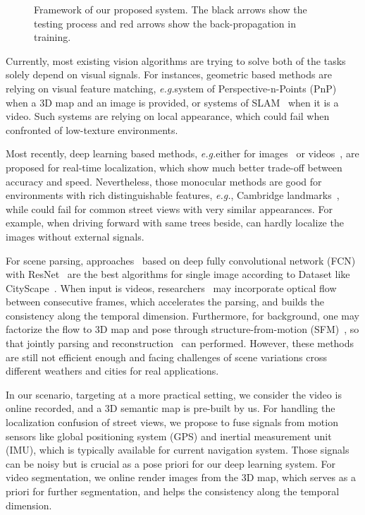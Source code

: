 \documentclass[10pt,twocolumn,letterpaper]{article}
\def\eg{\emph{e.g.}}
\begin{document}
\begin{figure*}[t]
\fbox{\rule{0pt}{2in} \rule{.9\linewidth}{0pt}}
   \caption{Framework of our proposed system. The black arrows show the testing process and red arrows show the back-propagation in training.}
\label{fig:framework}
\end{figure*}

Currently, most existing vision algorithms are trying to solve both of the tasks solely depend on visual signals. 
For instances, geometric based methods are relying on visual feature matching, \eg system of Perspective-n-Points (PnP)~\cite{haralick1994review,kneip2014upnp,campbell2017globally} when a 3D map and an image is provided, or systems of SLAM~\cite{engel2014lsd,mur2015orb,NewcombeLD11} when it is a video. Such systems are relying on local appearance, which could fail when confronted of low-texture environments.
 
Most recently, deep learning based methods, \eg either for images~\cite{Kendall_2015_ICCV} or videos~\cite{DBLP:journals/corr/ClarkWMTW17}, are proposed for real-time localization, which show much better trade-off between accuracy and speed.
Nevertheless, those monocular methods are good for environments with rich distinguishable features, \eg, Cambridge landmarks~\cite{Kendall_2015_ICCV}, while could fail for common street views with very similar appearances. For example, when driving forward with same trees beside, can hardly localize the images without external signals.

For scene parsing, approaches~\cite{ZhaoSQWJ16,ChenPSA17} based on deep fully convolutional network (FCN) with ResNet~\cite{HeZRS15} are the best algorithms for single image according to Dataset like CityScape~\cite{Cordts2016Cityscapes}. When input is videos, researchers~\cite{kundu2016feature,zhu2016deep} may incorporate optical flow between consecutive frames, which accelerates the parsing, and builds the consistency along the temporal dimension. Furthermore, for background, one may factorize the flow to 3D map and pose through structure-from-motion (SFM)~\cite{wu2011visualsfm}, so that jointly parsing and reconstruction~\cite{kundu2014joint} can performed. However, these methods are still not efficient enough and facing challenges of scene variations cross different weathers and cities for real applications.

In our scenario, targeting at a more practical setting, we consider the video is online recorded, and a 3D semantic map is pre-built by us. For handling the localization confusion of street views, we propose to fuse signals from motion sensors like global positioning system (GPS) and inertial measurement unit (IMU), which is typically available for current navigation system. Those signals can be noisy but is crucial as a pose priori for our deep learning system. 
For video segmentation, we online render images from the 3D map, which serves as a priori for further segmentation, and helps the consistency along the temporal dimension. 
\end{document}
